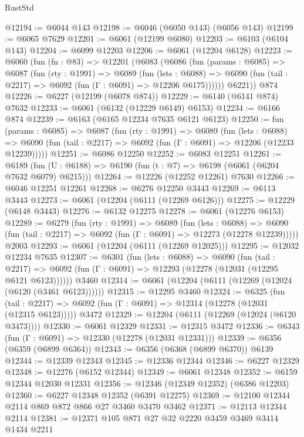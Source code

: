 \begin{lexlean}{RustStd}
\begin{coremodule}
{\begin{coremodule}
{{{{{{{{{{{{{{{{{{{{{{{{{{@12194 := @6044 @143
@12198 := @6046 (@6050 @143) (@6056 @143)
@12199 := @6065 @7629
@12201 := @6061 (@12199 @6080)
@12203 := @6103 (@6104 @143)
@12204 := @6099 @12203
@12206 := @6061 (@12204 @6128)
@12223 := @6060
    (fun (fn : @83) =>
    @12201
      (@6083
        (@6086
          (fun (params : @6085) =>
          @6087
            (fun (rty : @1991) =>
            @6089
              (fun (lets : @6088) =>
              @6090 (fun (tail : @2217) => @6092 (fun (Γ : @6091) => @12206 @6175))))))
        @6221))
    @874
@12226 := @6227 (@12199 (@6078 @874))
@12229 := @6140 (@6141 @874) @7632
@12233 := @6061 (@6132 (@12229 @6149) @6153)
@12234 := @6166 @874
@12239 := @6163 (@6165 @12234 @7635 @6121 @6123)
@12250 := fun (params : @6085) =>
  @6087
    (fun (rty : @1991) =>
    @6089
      (fun (lets : @6088) =>
      @6090 (fun (tail : @2217) => @6092 (fun (Γ : @6091) => @12206 (@12233 @12239)))))
@12251 := @6086 @12250
@12252 := @6083 @12251
@12261 := @6189 (fun (U : @6188) => @6190 (fun (t : @7) => @6198 (@6061 (@6204 @7632 @6079) @6215)))
@12264 := @12226 (@12252 @12261) @7630
@12266 := @6046 @12251 @12261
@12268 := @6276 @12250 @3443
@12269 := @6113 @3443
@12273 := @6061 (@12204 (@6111 (@12269 @6126)))
@12275 := @12229 (@6148 @3443)
@12276 := @6132 @12275
@12278 := @6061 (@12276 @6153)
@12289 := @6279
    (fun (rty : @1991) =>
    @6089
      (fun (lets : @6088) =>
      @6090 (fun (tail : @2217) => @6092 (fun (Γ : @6091) => @12273 (@12278 @12239)))))
    @2003
@12293 := @6061 (@12204 (@6111 (@12269 @12025)))
@12295 := @12032 @12234 @7635
@12307 := @6301
    (fun (lets : @6088) =>
    @6090
      (fun (tail : @2217) =>
      @6092 (fun (Γ : @6091) => @12293 (@12278 (@12031 (@12295 @6121 @6123))))))
    @3460
@12314 := @6061 (@12204 (@6111 (@12269 (@12024 (@6120 (@3461 @6123))))))
@12315 := @12295 @3460
@12324 := @6325
    (fun (tail : @2217) => @6092 (fun (Γ : @6091) => @12314 (@12278 (@12031 (@12315 @6123)))))
    @3472
@12329 := @12204 (@6111 (@12269 (@12024 (@6120 @3473))))
@12330 := @6061 @12329
@12331 := @12315 @3472
@12336 := @6343 (fun (Γ : @6091) => @12330 (@12278 (@12031 @12331)))
@12339 := @6356 (@6359 (@6899 @6364))
@12343 := @6356 (@6368 (@6899 @6370)) @6139
@12344 := @12339 @12343
@12345 := @12336 @12344
@12346 := @6227 @12329
@12348 := @12276 (@6152 @12344)
@12349 := @6061 @12348
@12352 := @6159 @12344 @12030 @12331
@12356 := @12346 (@12349 @12352) (@6386 @12203)
@12360 := @6227 @12348 @12352 (@6391 @12275)
@12369 := @12100 @12344 @2114 @869 @872 @866 @27 @3460 @3470 @3462
@12371 := @12113 @12344 @2114
@12381 := @12371 @105 @871 @27 @32 @2220 @3459 @3469 @3414 @1434 @2211
}}}}}}}}}}}}}}}}}}}}}}}}}}
\end{coremodule}}
\end{coremodule}
\end{lexlean}

